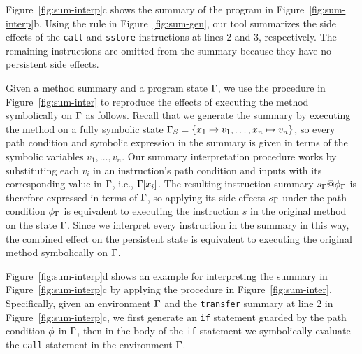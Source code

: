 \begin{example}
Figure~\ref{fig:sum-interp}c shows the summary of the program in
Figure~\ref{fig:sum-interp}b. Using the rule in Figure~\ref{fig:sum-gen}, our
tool summarizes the side effects of the \texttt{call} and \texttt{sstore}
instructions at lines 2 and 3, respectively.  The remaining instructions are
omitted from the summary because they have no persistent side effects.
\end{example}

Given a method summary and a program state $\Gamma$, we use the procedure in
Figure~\ref{fig:sum-inter} to reproduce the effects of executing the method
symbolically on $\Gamma$ as follows. Recall that we generate the summary by
executing the method on a fully symbolic state $\Gamma_S=\{x_1\mapsto
v_1,\ldots, x_n\mapsto v_n\}$, so every path
condition and symbolic expression in the summary is given in terms of the
symbolic variables $v_1,\ldots,v_n$. Our summary interpretation procedure works by
substituting each $v_i$ in an instruction's path condition and inputs with its
corresponding value in $\Gamma$, i.e., $\Gamma[x_i]$. The resulting instruction summary
$s_{\Gamma}@\phi_{\Gamma}$ is therefore expressed in terms of $\Gamma$, so applying its
side effects $s_{\Gamma}$ under the path condition $\phi_{\Gamma}$ is equivalent to
executing the instruction $s$ in the original method on the state $\Gamma$. 
Since we interpret every instruction in the summary in this way, the
combined effect on the persistent state is equivalent to executing the original
method symbolically on $\Gamma$.


\begin{example}
Figure~\ref{fig:sum-interp}d shows an example for interpreting the summary in
Figure~\ref{fig:sum-interp}c by applying the procedure in
Figure~\ref{fig:sum-inter}. Specifically, given an environment $\Gamma$ and the
\texttt{transfer} summary at line 2 in Figure~\ref{fig:sum-interp}c, we first
generate an \texttt{if} statement guarded by the path condition $\phi$ in $\Gamma$, 
then in the body of the \texttt{if} statement we symbolically
evaluate the \texttt{call} statement in the environment $\Gamma$.
\end{example}


